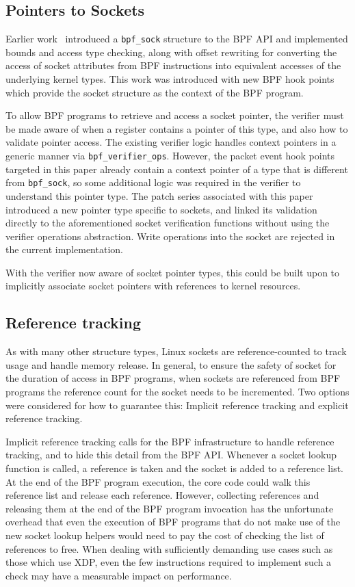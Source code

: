 \documentclass[10pt,sigconf,authorversion]{lpc}
\begin{document}
\subsection{Pointers to Sockets}

Earlier work~\cite{bpf-sock} introduced a \verb+bpf_sock+ structure to the BPF
API and implemented bounds and access type checking, along with offset
rewriting for converting the access of socket attributes from BPF instructions
into equivalent accesses of the underlying kernel types. This work was
introduced with new BPF hook points which provide the socket structure as the
context of the BPF program.

To allow BPF programs to retrieve and access a socket pointer, the verifier
must be made aware of when a register contains a pointer of this type, and also
how to validate pointer access. The existing verifier logic handles context
pointers in a generic manner via \verb+bpf_verifier_ops+. However, the packet
event hook points targeted in this paper already contain a context pointer of a
type that is different from \verb+bpf_sock+, so some additional logic was
required in the verifier to understand this pointer type. The patch series
associated with this paper introduced a new pointer type specific to sockets,
and linked its validation directly to the aforementioned socket verification
functions without using the verifier operations abstraction. Write operations
into the socket are rejected in the current implementation.

With the verifier now aware of socket pointer types, this could be built upon
to implicitly associate socket pointers with references to kernel resources.

\subsection{Reference tracking}

As with many other structure types, Linux sockets are reference-counted to
track usage and handle memory release. In general, to ensure the safety of
socket for the duration of access in BPF programs, when sockets are referenced
from BPF programs the reference count for the socket needs to be incremented.
Two options were considered for how to guarantee this: Implicit reference
tracking and explicit reference tracking.

Implicit reference tracking calls for the BPF infrastructure to handle
reference tracking, and to hide this detail from the BPF API. Whenever a socket
lookup function is called, a reference is taken and the socket is added to a
reference list. At the end of the BPF program execution, the core code could
walk this reference list and release each reference. However, collecting
references and releasing them at the end of the BPF program invocation has the
unfortunate overhead that even the execution of BPF programs that do not make
use of the new socket lookup helpers would need to pay the cost of checking the
list of references to free. When dealing with sufficiently demanding use cases
such as those which use XDP, even the few instructions required to implement
such a check may have a measurable impact on performance.
\end{document}
